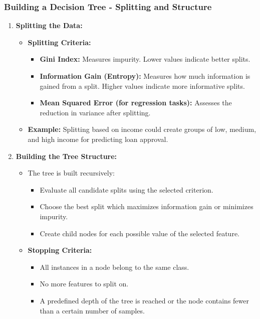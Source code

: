 \documentclass[aspectratio=169]{beamer}
\begin{document}
\begin{frame}[fragile]
    \frametitle{Building a Decision Tree - Splitting and Structure}
    \begin{enumerate}[resume]
        \item \textbf{Splitting the Data:}
            \begin{itemize}
                \item \textbf{Splitting Criteria:}
                    \begin{itemize}
                        \item \textbf{Gini Index:} Measures impurity. Lower values indicate better splits.
                        \item \textbf{Information Gain (Entropy):} Measures how much information is gained from a split. Higher values indicate more informative splits.
                        \item \textbf{Mean Squared Error (for regression tasks):} Assesses the reduction in variance after splitting.
                    \end{itemize}
                \item \textbf{Example:} Splitting based on income could create groups of low, medium, and high income for predicting loan approval.
            \end{itemize}
        
        \item \textbf{Building the Tree Structure:}
            \begin{itemize}
                \item The tree is built recursively:
                    \begin{itemize}
                        \item Evaluate all candidate splits using the selected criterion.
                        \item Choose the best split which maximizes information gain or minimizes impurity.
                        \item Create child nodes for each possible value of the selected feature.
                    \end{itemize}
                \item \textbf{Stopping Criteria:}
                    \begin{itemize}
                        \item All instances in a node belong to the same class.
                        \item No more features to split on.
                        \item A predefined depth of the tree is reached or the node contains fewer than a certain number of samples.
                    \end{itemize}
            \end{itemize}
    \end{enumerate}
\end{frame}
\end{document}

